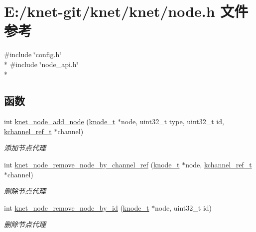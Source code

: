 \hypertarget{a00102}{}\section{E\+:/knet-\/git/knet/knet/node.h 文件参考}
\label{a00102}
{\ttfamily \#include \char`\"{}config.\+h\char`\"{}}\\*
{\ttfamily \#include \char`\"{}node\+\_\+api.\+h\char`\"{}}\\*
\subsection*{函数}
\begin{DoxyCompactItemize}
\item 
int \hyperlink{a00102_afa81e5a2fe15a15a3ee08696ebb9fb7f_afa81e5a2fe15a15a3ee08696ebb9fb7f}{knet\+\_\+node\+\_\+add\+\_\+node} (\hyperlink{a00066_a5e720b27efbc9ad744240f5f4233763a_a5e720b27efbc9ad744240f5f4233763a}{knode\+\_\+t} $\ast$node, uint32\+\_\+t type, uint32\+\_\+t id, \hyperlink{a00066_a3b7e82599367eade261456f60ebe2cd9_a3b7e82599367eade261456f60ebe2cd9}{kchannel\+\_\+ref\+\_\+t} $\ast$channel)
\begin{DoxyCompactList}\small\item\em 添加节点代理 \end{DoxyCompactList}\item 
int \hyperlink{a00102_a8e76a4e4b505064bc36779f415bf1b98_a8e76a4e4b505064bc36779f415bf1b98}{knet\+\_\+node\+\_\+remove\+\_\+node\+\_\+by\+\_\+channel\+\_\+ref} (\hyperlink{a00066_a5e720b27efbc9ad744240f5f4233763a_a5e720b27efbc9ad744240f5f4233763a}{knode\+\_\+t} $\ast$node, \hyperlink{a00066_a3b7e82599367eade261456f60ebe2cd9_a3b7e82599367eade261456f60ebe2cd9}{kchannel\+\_\+ref\+\_\+t} $\ast$channel)
\begin{DoxyCompactList}\small\item\em 删除节点代理 \end{DoxyCompactList}\item 
int \hyperlink{a00102_afd42a88def40617892cb161ebee49a8b_afd42a88def40617892cb161ebee49a8b}{knet\+\_\+node\+\_\+remove\+\_\+node\+\_\+by\+\_\+id} (\hyperlink{a00066_a5e720b27efbc9ad744240f5f4233763a_a5e720b27efbc9ad744240f5f4233763a}{knode\+\_\+t} $\ast$node, uint32\+\_\+t id)
\begin{DoxyCompactList}\small\item\em 删除节点代理 \end{DoxyCompactList}\item 

\end{DoxyCompactItemize}
